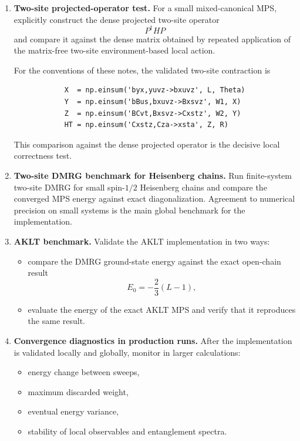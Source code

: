 \documentclass[aps,prb,onecolumn,nofootinbib]{revtex4-2}
\begin{document}
\begin{enumerate}
		\item \textbf{Two-site projected-operator test.}
		For a small mixed-canonical MPS, explicitly construct the dense projected two-site operator
		\[
		P^\dagger H P
		\]
		and compare it against the dense matrix obtained by repeated application of the matrix-free
		two-site environment-based local action.
		
		For the conventions of these notes, the validated two-site contraction is
		\begin{verbatim}
			X  = np.einsum('byx,yuvz->bxuvz', L, Theta)
			Y  = np.einsum('bBus,bxuvz->Bxsvz', W1, X)
			Z  = np.einsum('BCvt,Bxsvz->Cxstz', W2, Y)
			HT = np.einsum('Cxstz,Cza->xsta', Z, R)
		\end{verbatim}
		
		This comparison against the dense projected operator is the decisive local correctness test.
		
		\item \textbf{Two-site DMRG benchmark for Heisenberg chains.}
		Run finite-system two-site DMRG for small spin-$1/2$ Heisenberg chains and compare the
		converged MPS energy against exact diagonalization. Agreement to numerical precision on
		small systems is the main global benchmark for the implementation.
		
		\item \textbf{AKLT benchmark.}
		Validate the AKLT implementation in two ways:
		\begin{itemize}
			\item compare the DMRG ground-state energy against the exact open-chain result
			\[
			E_0 = -\frac23 (L-1),
			\]
			\item evaluate the energy of the exact AKLT MPS and verify that it reproduces the same result.
		\end{itemize}
		
		\item \textbf{Convergence diagnostics in production runs.}
		After the implementation is validated locally and globally, monitor in larger calculations:
		\begin{itemize}
			\item energy change between sweeps,
			\item maximum discarded weight,
			\item eventual energy variance,
			\item stability of local observables and entanglement spectra.
		\end{itemize}
	\end{enumerate}
	
\end{document}
